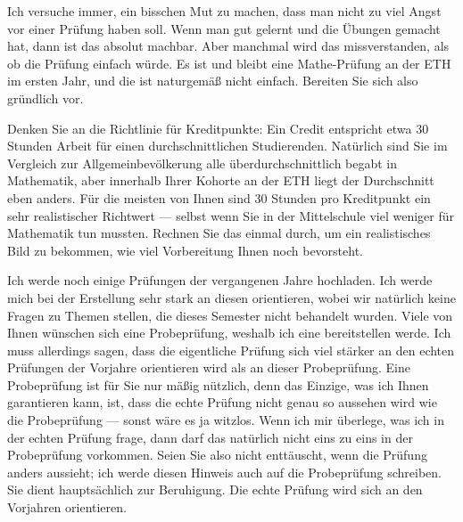 \begin{spoken-clean}[01:26:29 - 01:26:54]
Ich versuche immer, ein bisschen Mut zu machen, dass man nicht zu viel Angst vor einer Prüfung haben soll. Wenn man gut gelernt und die Übungen gemacht hat, dann ist das absolut machbar. Aber manchmal wird das missverstanden, als ob die Prüfung einfach würde. Es ist und bleibt eine Mathe-Prüfung an der ETH im ersten Jahr, und die ist naturgemäß nicht einfach. Bereiten Sie sich also gründlich vor.

Denken Sie an die Richtlinie für Kreditpunkte: Ein Credit entspricht etwa $30$ Stunden Arbeit für einen durchschnittlichen Studierenden. Natürlich sind Sie im Vergleich zur Allgemeinbevölkerung alle überdurchschnittlich begabt in Mathematik, aber innerhalb Ihrer Kohorte an der ETH liegt der Durchschnitt eben anders. Für die meisten von Ihnen sind $30$ Stunden pro Kreditpunkt ein sehr realistischer Richtwert --- selbst wenn Sie in der Mittelschule viel weniger für Mathematik tun mussten. Rechnen Sie das einmal durch, um ein realistisches Bild zu bekommen, wie viel Vorbereitung Ihnen noch bevorsteht.

Ich werde noch einige Prüfungen der vergangenen Jahre hochladen. Ich werde mich bei der Erstellung sehr stark an diesen orientieren, wobei wir natürlich keine Fragen zu Themen stellen, die dieses Semester nicht behandelt wurden. Viele von Ihnen wünschen sich eine Probeprüfung, weshalb ich eine bereitstellen werde. Ich muss allerdings sagen, dass die eigentliche Prüfung sich viel stärker an den echten Prüfungen der Vorjahre orientieren wird als an dieser Probeprüfung. Eine Probeprüfung ist für Sie nur mäßig nützlich, denn das Einzige, was ich Ihnen garantieren kann, ist, dass die echte Prüfung nicht genau so aussehen wird wie die Probeprüfung --- sonst wäre es ja witzlos. Wenn ich mir überlege, was ich in der echten Prüfung frage, dann darf das natürlich nicht eins zu eins in der Probeprüfung vorkommen. Seien Sie also nicht enttäuscht, wenn die Prüfung anders aussieht; ich werde diesen Hinweis auch auf die Probeprüfung schreiben. Sie dient hauptsächlich zur Beruhigung. Die echte Prüfung wird sich an den Vorjahren orientieren.


\end{spoken-clean}
